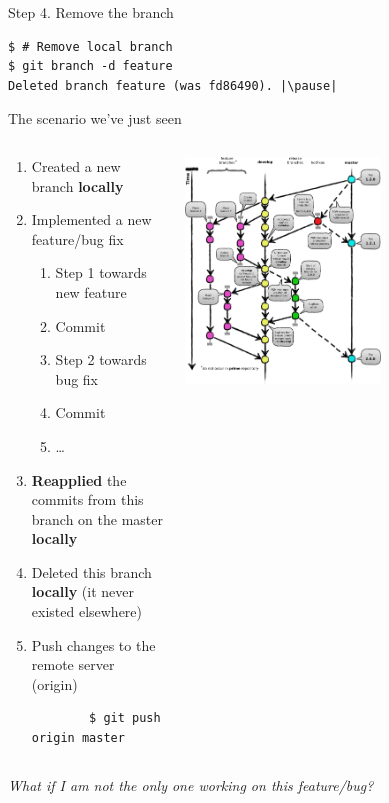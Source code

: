 \begin{frame}[fragile]{Step 4. Remove the branch}
  	\begin{lstlisting}
$ # Remove local branch
$ git branch -d feature
Deleted branch feature (was fd86490). |\pause|
	\end{lstlisting}
\end{frame}


\begin{frame}[fragile]{The scenario we've just seen}
    \begin{columns}
\begin{column}{0.6\textwidth}
\small
	\begin{enumerate}
		\item Created a new branch \textbf{locally}
		\item Implemented a new feature/bug fix
		\begin{enumerate}
			\item Step 1 towards new feature
			\item Commit
			\item Step 2 towards bug fix
			\item Commit
			\item \ldots
		\end{enumerate}
		\item \textbf{Reapplied} the commits from this branch on the master \textbf{locally}
		\item Deleted this branch \textbf{locally} (it never existed elsewhere)
		
		\item Push changes to the remote server (origin)
		\begin{lstlisting}
		$ git push origin master
		\end{lstlisting}
	\end{enumerate}
\end{column}
\begin{column}{0.9\textwidth}
\includegraphics[height=0.7\textheight, width=0.6\textwidth]{images/gitflow}
\end{column}
\end{columns}

	\pause
	\textit{What if I am not the only one working on this feature/bug?}
\end{frame}

